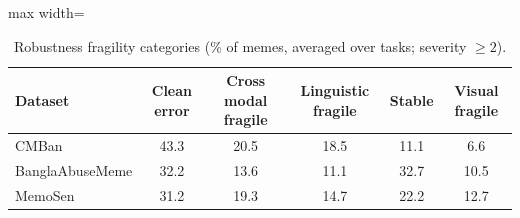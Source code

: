 \begin{table}[t]
\centering
\small
\caption{Robustness fragility categories (\% of memes, averaged over tasks; severity $\geq 2$).}
\label{tab:cross_frag}
\begin{adjustbox}{max width=\columnwidth}
\begin{tabular}{lccccc}
\toprule
Dataset & Clean error & Cross modal fragile & Linguistic fragile & Stable & Visual fragile \\
\midrule
CMBan & 43.3 & 20.5 & 18.5 & 11.1 & 6.6 \\
BanglaAbuseMeme & 32.2 & 13.6 & 11.1 & 32.7 & 10.5 \\
MemoSen & 31.2 & 19.3 & 14.7 & 22.2 & 12.7 \\
\bottomrule
\end{tabular}
\end{adjustbox}
\end{table}
